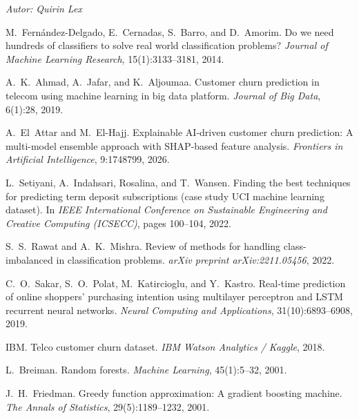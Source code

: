 \documentclass[10pt]{scrartcl}
\begin{document}
\begin{flushright}\textit{Autor: Quirin Lex}\end{flushright}

\begin{thebibliography}{}
\small

M.~Fern\'{a}ndez-Delgado, E.~Cernadas, S.~Barro, and D.~Amorim.
\newblock Do we need hundreds of classifiers to solve real world classification problems?
\newblock \emph{Journal of Machine Learning Research}, 15(1):3133--3181, 2014.

A.~K.~Ahmad, A.~Jafar, and K.~Aljoumaa.
\newblock Customer churn prediction in telecom using machine learning in big data platform.
\newblock \emph{Journal of Big Data}, 6(1):28, 2019.

A.~El~Attar and M.~El-Hajj.
\newblock Explainable AI-driven customer churn prediction: A multi-model ensemble approach with SHAP-based feature analysis.
\newblock \emph{Frontiers in Artificial Intelligence}, 9:1748799, 2026.

L.~Setiyani, A.~Indahsari, Rosalina, and T.~Wansen.
\newblock Finding the best techniques for predicting term deposit subscriptions (case study UCI machine learning dataset).
\newblock In \emph{IEEE International Conference on Sustainable Engineering and Creative Computing (ICSECC)}, pages 100--104, 2022.

S.~S.~Rawat and A.~K.~Mishra.
\newblock Review of methods for handling class-imbalanced in classification problems.
\newblock \emph{arXiv preprint arXiv:2211.05456}, 2022.

C.~O.~Sakar, S.~O.~Polat, M.~Katircioglu, and Y.~Kastro.
\newblock Real-time prediction of online shoppers' purchasing intention using multilayer perceptron and LSTM recurrent neural networks.
\newblock \emph{Neural Computing and Applications}, 31(10):6893--6908, 2019.

IBM.
\newblock Telco customer churn dataset.
\newblock \emph{IBM Watson Analytics / Kaggle}, 2018.

L.~Breiman.
\newblock Random forests.
\newblock \emph{Machine Learning}, 45(1):5--32, 2001.

J.~H.~Friedman.
\newblock Greedy function approximation: A gradient boosting machine.
\newblock \emph{The Annals of Statistics}, 29(5):1189--1232, 2001.


\end{thebibliography}
\end{document}
